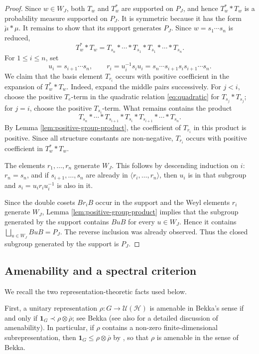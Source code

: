 \documentclass[12pt,a4paper]{amsproc}
\theoremstyle{definition}
\newcommand{\cH}{\mathcal H}
\newcommand{\cU}{\mathcal U}
\newcommand{\one}{\mathbf 1}
\newcommand{\ol}[1]{\overline{#1}}
\newcommand{\weakcontain}{\prec}
\begin{document}
\begin{proof}
Since $w\in W_J$, both $T_w$ and $T_w^*$ are supported on $P_J$, and hence $T_w^**T_w$ is a probability measure supported on $P_J$. It is symmetric because it has the form $\check\mu*\mu$.
It remains to show that its support generates $P_J$. 
Since $w=s_1\cdots s_n$ is reduced,
\[
        T_w^**T_w
        =T_{s_n}*\cdots*T_{s_1}*T_{s_1}*\cdots*T_{s_n}.
\]
For $1\leq i\leq n$, set
\[
        u_i=s_{i+1}\cdots s_n,
        \qquad
        r_i=u_i^{-1}s_i u_i=s_n\cdots s_{i+1}s_i s_{i+1}\cdots s_n.
\]
We claim that the basis element $T_{r_i}$ occurs with positive coefficient in the expansion of $T_w^**T_w$.
Indeed, expand the middle pairs successively. For $j<i$, choose the positive $T_e$-term in the quadratic relation \eqref{eq:quadratic} for $T_{s_j}*T_{s_j}$; for $j=i$, choose the positive $T_{s_i}$-term. What remains contains the product
\[
        T_{s_n}*\cdots*T_{s_{i+1}}*T_{s_i}*T_{s_{i+1}}*\cdots*T_{s_n}.
\]
By Lemma \ref{lem:positive-group-product}, the coefficient of $T_{r_i}$ in this product is positive. Since all structure constants are non-negative, $T_{r_i}$ occurs with positive coefficient in $T_w^**T_w$.

The elements $r_1,\ldots,r_n$ generate $W_J$. This follows by descending induction on $i$: $r_n=s_n$, and if $s_{i+1},\ldots,s_n$ are already in $\langle r_i,\ldots,r_n\rangle$, then $u_i$ is in that subgroup and $s_i=u_ir_i u_i^{-1}$ is also in it.

Since the double cosets $Br_iB$ occur in the support and the Weyl elements $r_i$ generate $W_J$, Lemma \ref{lem:positive-group-product} implies that the subgroup generated by the support contains $BuB$ for every $u\in W_J$. Hence it contains $\bigsqcup_{u\in W_J}BuB=P_J$. The reverse inclusion was already observed. Thus the closed subgroup generated by the support is $P_J$.
\end{proof}

\subsection{Amenability and a spectral criterion}
\label{sec:bekka}

We recall the two representation-theoretic facts used below. 

First, a unitary representation $\rho:G\to\cU(\cH)$ is amenable in Bekka's sense if and only if $\one_G\weakcontain \rho\otimes\ol\rho$; see Bekka \cite{BekkaAmenable} (see also  \cite[Appendix G]{BHV} for a detailed discussion of amenability). In particular, if $\rho$ contains a non-zero finite-dimensional subrepresentation, then $\one_G\leq  \rho\otimes\ol\rho$ by \cite[Proposition~A.1.12]{BHV}, so that $\rho$  is amenable in the sense of Bekka. 
\end{document}

